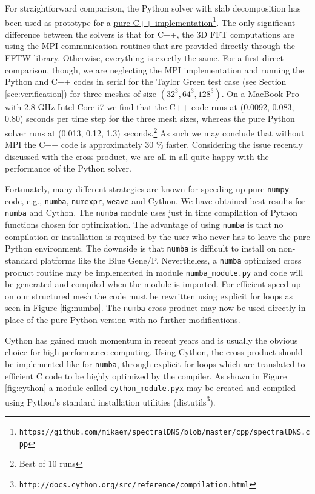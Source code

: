 \documentclass[final,1p,times]{elsarticle}
\newcommand{\inpyth}{\lstinline[style=inlinestyle]} %[]%
\begin{document}
For straightforward comparison, the Python solver with slab decomposition has been used as prototype for a
\href{https://github.com/mikaem/spectralDNS/blob/master/cpp/spectralDNS.cpp}{pure C++ implementation}\footnote{\texttt{https://github.com/mikaem/spectralDNS/blob/master/cpp/spectralDNS.cpp}}. The
only significant difference between the solvers is that for C++, the 3D FFT computations are using the MPI communication routines that are provided directly through the FFTW library. Otherwise, everything is exectly the same. For a first direct comparison, though, we are neglecting the MPI implementation and running the Python and C++ codes in serial for the Taylor Green test case (see Section \ref{sec:verification}) for three meshes of size $(32^3, 64^3, 128^3)$. On a
MacBook Pro with 2.8 GHz Intel Core i7 we find that the C++ code runs at (0.0092, 0.083, 0.80) seconds per time step for the three mesh sizes, whereas the pure Python solver runs at (0.013, 0.12, 1.3) seconds.\footnote{Best of 10 runs} As such we may conclude that without MPI the C++ code is approximately 30 \% faster. Considering the issue recently discussed with the cross product, we are all in all quite happy with the performance of the Python solver.

Fortunately, many different strategies are known for speeding up pure \texttt{numpy} code, e.g.,  \inpyth{numba}, \inpyth{numexpr}, \inpyth{weave} and Cython. We have obtained best results for \inpyth{numba} and Cython. The \inpyth{numba} module uses just in time compilation of Python functions chosen for optimization. The advantage of using \texttt{numba} is that no compilation or installation is required by the user who never has to leave the pure Python environment. The downside is that \inpyth{numba} is difficult to install on non-standard platforms like the Blue Gene/P. Nevertheless, a \texttt{numba} optimized cross product routine may be implemented in module \inpyth{numba_module.py} and code will be generated and compiled when the module is imported.  For efficient speed-up on our structured mesh the code must be rewritten using explicit for loops as seen in Figure \ref{fig:numba}. The \texttt{numba} cross product may now be used directly in place of the pure Python version with no further modifications.

Cython has gained much momentum in recent years and is usually the obvious choice for high performance computing. Using Cython, the cross product should be implemented like for \inpyth{numba}, through explicit for loops which are translated to efficient C code to be highly optimized by the compiler. As shown in Figure \ref{fig:cython} a module called \inpyth{cython_module.pyx} may be created and compiled using Python's standard installation utilities (\href{http://docs.cython.org/src/reference/compilation.html}{distutils}\footnote{\texttt{http://docs.cython.org/src/reference/compilation.html}}).
\end{document}
